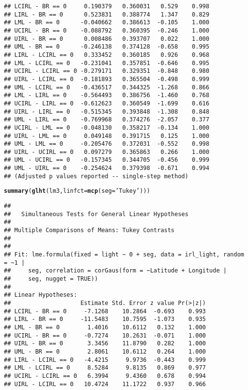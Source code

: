 \documentclass[letterpaper,12pt]{article}\usepackage[]{graphicx}\usepackage[]{color}
\makeatletter
\newcommand{\hlstr}[1]{\textcolor[rgb]{0.192,0.494,0.8}{#1}}%
\newcommand{\hlstd}[1]{\textcolor[rgb]{0.345,0.345,0.345}{#1}}%
\newcommand{\hlkwc}[1]{\textcolor[rgb]{0.333,0.667,0.333}{#1}}%
\newcommand{\hlkwd}[1]{\textcolor[rgb]{0.737,0.353,0.396}{\textbf{#1}}}%
\newenvironment{kframe}{%
 \def\at@end@of@kframe{}%
 \ifinner\ifhmode%
  \def\at@end@of@kframe{\end{minipage}}%
  \begin{minipage}{\columnwidth}%
 \fi\fi%
 \def\FrameCommand##1{\hskip\@totalleftmargin \hskip-\fboxsep
 \colorbox{shadecolor}{##1}\hskip-\fboxsep
     \hskip-\linewidth \hskip-\@totalleftmargin \hskip\columnwidth}%
 \MakeFramed {\advance\hsize-\width
   \@totalleftmargin\z@ \linewidth\hsize
   \@setminipage}}%
 {\par\unskip\endMakeFramed%
 \at@end@of@kframe}
\newenvironment{knitrout}{}{} %
\makeatother
\begin{document}
\begin{knitrout}
\begin{kframe}
\begin{verbatim}
## LCIRL - BR == 0     0.190379   0.360031   0.529    0.998
## LIRL - BR == 0      0.523831   0.388774   1.347    0.829
## LML - BR == 0      -0.040662   0.386613  -0.105    1.000
## UCIRL - BR == 0    -0.088792   0.360395  -0.246    1.000
## UIRL - BR == 0      0.008486   0.393707   0.022    1.000
## UML - BR == 0      -0.246138   0.374128  -0.658    0.995
## LIRL - LCIRL == 0   0.333452   0.360185   0.926    0.968
## LML - LCIRL == 0   -0.231041   0.357851  -0.646    0.995
## UCIRL - LCIRL == 0 -0.279171   0.329351  -0.848    0.980
## UIRL - LCIRL == 0  -0.181893   0.365504  -0.498    0.999
## UML - LCIRL == 0   -0.436517   0.344325  -1.268    0.866
## LML - LIRL == 0    -0.564493   0.386756  -1.460    0.768
## UCIRL - LIRL == 0  -0.612623   0.360549  -1.699    0.616
## UIRL - LIRL == 0   -0.515345   0.393848  -1.308    0.848
## UML - LIRL == 0    -0.769968   0.374276  -2.057    0.377
## UCIRL - LML == 0   -0.048130   0.358217  -0.134    1.000
## UIRL - LML == 0     0.049148   0.391715   0.125    1.000
## UML - LML == 0     -0.205476   0.372031  -0.552    0.998
## UIRL - UCIRL == 0   0.097279   0.365863   0.266    1.000
## UML - UCIRL == 0   -0.157345   0.344705  -0.456    0.999
## UML - UIRL == 0    -0.254624   0.379398  -0.671    0.994
## (Adjusted p values reported -- single-step method)
\end{verbatim}
\begin{alltt}
\hlkwd{summary}\hlstd{(}\hlkwd{glht}\hlstd{(lm3,} \hlkwc{linfct} \hlstd{=} \hlkwd{mcp}\hlstd{(}\hlkwc{seg} \hlstd{=} \hlstr{'Tukey'}\hlstd{)))}
\end{alltt}
\begin{verbatim}
## 
## 	 Simultaneous Tests for General Linear Hypotheses
## 
## Multiple Comparisons of Means: Tukey Contrasts
## 
## 
## Fit: lme.formula(fixed = light ~ 0 + seg, data = irl_light, random = ~1 | 
##     seg, correlation = corGaus(form = ~Latitude + Longitude | 
##     seg, nugget = TRUE))
## 
## Linear Hypotheses:
##                    Estimate Std. Error z value Pr(>|z|)
## LCIRL - BR == 0     -7.1268    10.2864  -0.693    0.993
## LIRL - BR == 0     -11.5483    10.7595  -1.073    0.935
## LML - BR == 0        1.4016    10.6112   0.132    1.000
## UCIRL - BR == 0     -0.7274    10.2631  -0.071    1.000
## UIRL - BR == 0       3.3456    11.8790   0.282    1.000
## UML - BR == 0        2.8061    10.6112   0.264    1.000
## LIRL - LCIRL == 0   -4.4215     9.9736  -0.443    0.999
## LML - LCIRL == 0     8.5284     9.8135   0.869    0.977
## UCIRL - LCIRL == 0   6.3994     9.4360   0.678    0.994
## UIRL - LCIRL == 0   10.4724    11.1722   0.937    0.966

\end{verbatim}
\end{kframe}
\end{knitrout}
\end{document}

